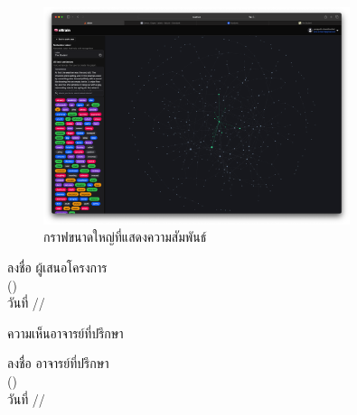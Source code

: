 \documentclass[12pt,a4paper]{article}
\newcommand{\textlight}[1]{{\thailightfont #1}}
\newcommand{\dotrule}[1]{\hdashrule{#1}{0.6pt}{1pt}}
\begin{document}
\begin{enumerate}[leftmargin=2cm]
    \begin{figure}[H]
        \centering
        \includegraphics[width=0.8\textwidth]{images/platform_1.png}
        \caption{กราฟขนาดใหญ่ที่แสดงความสัมพันธ์}
        \label{fig:platform_1}
    \end{figure}

\end{enumerate}

\vspace{5cm}

\hfill\begin{minipage}{10cm}
    \vspace{0.5cm}
    \begin{center}
        \textlight{ลงชื่อ \dotrule{150pt} ผู้เสนอโครงการ}\\[0.2cm]
        \textlight{(\dotrule{180pt})}\\[0.4cm]
        \textlight{วันที่ \dotrule{50pt}/\dotrule{50pt}/\dotrule{50pt}}
    \end{center}
    \vspace{0.5cm}
\end{minipage}         

\vspace{0.5cm}

\textlight{ความเห็นอาจารย์ที่ปรึกษา}
\dotrule{378pt}

\dotrule{500pt}

\dotrule{500pt}

\vspace{0.5cm}

\hfill\begin{minipage}{10cm}
    \vspace{0.5cm}
    \begin{center}
        \textlight{ลงชื่อ \dotrule{150pt} อาจารย์ที่ปรึกษา}\\[0.2cm]
        \textlight{(\dotrule{180pt})}\\[0.4cm]
        \textlight{วันที่ \dotrule{50pt}/\dotrule{50pt}/\dotrule{50pt}}
    \end{center}
    \vspace{0.5cm}
\end{minipage}                          
\end{document}

